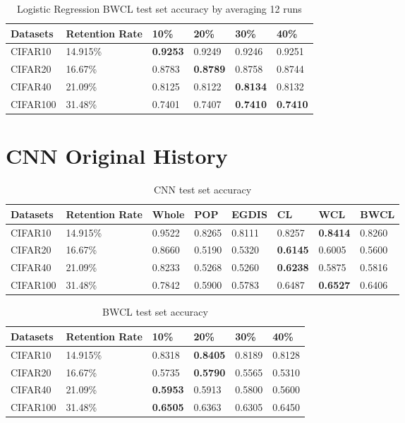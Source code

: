 \begin{table}[H]
    \centering
    \begin{tabular}{|l|l|l|l|l|l|}
    \hline
        Datasets & Retention Rate & 10\% & 20\% & 30\% & 40\% \\ \hline
        CIFAR10 & 14.915\% & \textbf{0.9253} & 0.9249 & 0.9246 & 0.9251 \\ \hline
        CIFAR20 & 16.67\% & 0.8783 & \textbf{0.8789} & 0.8758 & 0.8744 \\ \hline
        CIFAR40 & 21.09\% & 0.8125 &  0.8122 & \textbf{0.8134} & 0.8132 \\ \hline
        CIFAR100 & 31.48\% & 0.7401 & 0.7407 & \textbf{0.7410} & \textbf{0.7410} \\ \hline
    \end{tabular}
    \caption{Logistic Regression BWCL test set accuracy by averaging 12 runs}
    \label{bwcl-lr}
\end{table}

\section{CNN Original History}
\begin{table}[H]
    \centering
    \begin{tabular}{|l|l|l|l|l|l|l|l|}
    \hline
        Datasets & Retention Rate  & Whole & POP & EGDIS & CL & WCL & BWCL \\ \hline
        CIFAR10 & 14.915\% & 0.9522 & 0.8265 & 0.8111 & 0.8257 & \textbf{0.8414} & 0.8260 \\ \hline
        CIFAR20 & 16.67\% & 0.8660 & 0.5190 & 0.5320 & \textbf{0.6145} & 0.6005 & 0.5600 \\ \hline
        CIFAR40 & 21.09\% & 0.8233 & 0.5268 & 0.5260 & \textbf{0.6238} & 0.5875 & 0.5816 \\ \hline
        CIFAR100 & 31.48\% & 0.7842 & 0.5900 & 0.5783 & 0.6487 & \textbf{0.6527} & 0.6406 \\ \hline
    \end{tabular}
    \caption{CNN test set accuracy}
    \label{cnn_res}
\end{table}

\begin{table}[H]
    \centering
    \begin{tabular}{|l|l|l|l|l|l|}
    \hline
        Datasets &Retention Rate  &  10\% & 20\% & 30\% & 40\% \\ \hline
        CIFAR10 & 14.915\% &0.8318 & \textbf{0.8405} & 0.8189 & 0.8128 \\ \hline
        CIFAR20 & 16.67\% &0.5735 & \textbf{0.5790} & 0.5565 & 0.5310 \\ \hline
        CIFAR40 & 21.09\% & \textbf{0.5953} & 0.5913 & 0.5800 & 0.5600 \\ \hline
        CIFAR100 & 31.48\% & \textbf{0.6505} & 0.6363 & 0.6305 & 0.6450 \\ \hline
    \end{tabular}
    \caption{BWCL test set accuracy}
    \label{132e3213}
\end{table}


